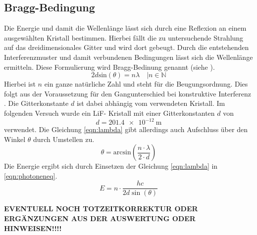\subsection{Bragg-Bedingung}
Die Energie und damit die Wellenlänge lässt sich durch eine Reflexion an einem ausgewählten Kristall bestimmen. Hierbei fällt die 
zu untersuchende Strahlung auf das dreidimensionales Gitter und wird dort gebeugt. Durch die entstehenden Interferenzmuster und damit verbundenen Bedingungen lässt sich
die Wellenlänge ermitteln. Diese Formulierung wird Bragg-Bedinung genannt (siehe \cite{skript4}).
\begin{equation}
\label{eqn:lambda}
2 d \text{sin}(\theta) =  n \lambda \quad | n \in \mathbb{N}
\end{equation}
Hierbei ist $n$ ein ganze natürliche Zahl und steht für die Beugungsordnung. Dies folgt aus der Voraussetzung für den Gangunterschied bei konstruktive Interferenz
. Die Gitterkonstante $d$ ist dabei abhängig vom verwendeten Kristall.
Im folgenden Versuch wurde ein LiF- Kristall mit einer Gitterkonstanten $d$ von
\begin{equation}
d = \SI{201.4e-12}{\meter}
\end{equation}
verwendet.
Die Gleichung \eqref{eqn:lambda} gibt allerdings auch Aufschluss über den Winkel $\theta$ durch Umstellen zu.
\begin{equation}
\label{eqn:winkelmitlambda}
\theta = \text{arcsin}\left(\frac{n \cdot \lambda}{2 \cdot d}\right)
\end{equation}
Die Energie ergibt sich durch Einsetzen der Gleichung \eqref{eqn:lambda} in \eqref{eqn:photoneneq}.
\begin{equation}
    \label{eqn:braggEnergy}
    E = n \cdot \frac{h c}{2 d \sin (\theta)}
\end{equation}

\textbf{EVENTUELL NOCH TOTZEITKORREKTUR ODER ERGÄNZUNGEN AUS DER AUSWERTUNG ODER HINWEISEN!!!!}